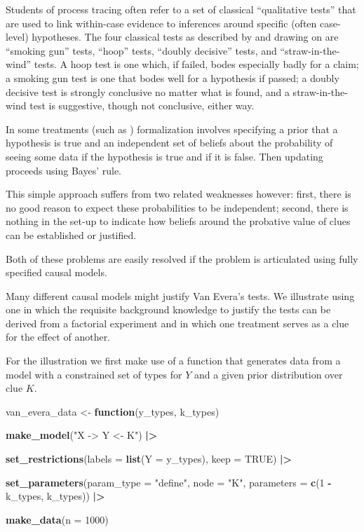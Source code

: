 \documentclass[
  12pt,
]{book}
\newenvironment{Shaded}{\begin{snugshade}}{\end{snugshade}}
\newcommand{\AttributeTok}[1]{\textcolor[rgb]{0.13,0.29,0.53}{#1}}
\newcommand{\ConstantTok}[1]{\textcolor[rgb]{0.56,0.35,0.01}{#1}}
\newcommand{\ControlFlowTok}[1]{\textcolor[rgb]{0.13,0.29,0.53}{\textbf{#1}}}
\newcommand{\DecValTok}[1]{\textcolor[rgb]{0.00,0.00,0.81}{#1}}
\newcommand{\FunctionTok}[1]{\textcolor[rgb]{0.13,0.29,0.53}{\textbf{#1}}}
\newcommand{\NormalTok}[1]{#1}
\newcommand{\OtherTok}[1]{\textcolor[rgb]{0.56,0.35,0.01}{#1}}
\newcommand{\SpecialCharTok}[1]{\textcolor[rgb]{0.81,0.36,0.00}{\textbf{#1}}}
\newcommand{\StringTok}[1]{\textcolor[rgb]{0.31,0.60,0.02}{#1}}
\begin{document}
Students of process tracing often refer to a set of classical ``qualitative tests'' that are used to link within-case evidence to inferences around specific (often case-level) hypotheses. The four classical tests as described by \citet{collier2011understanding} and drawing on \citet{Van-Evera:1997} are ``smoking gun'' tests, ``hoop'' tests, ``doubly decisive'' tests, and ``straw-in-the-wind'' tests. A hoop test is one which, if failed, bodes especially badly for a claim; a smoking gun test is one that bodes well for a hypothesis if passed; a doubly decisive test is strongly conclusive no matter what is found, and a straw-in-the-wind test is suggestive, though not conclusive, either way.

In some treatments (such as \citet{humphreys2015mixing}) formalization involves specifying a prior that a hypothesis is true and an independent set of beliefs about the probability of seeing some data if the hypothesis is true and if it is false. Then updating proceeds using Bayes' rule.

This simple approach suffers from two related weaknesses however: first, there is no good reason to expect these probabilities to be independent; second, there is nothing in the set-up to indicate how beliefs around the probative value of clues can be established or justified.

Both of these problems are easily resolved if the problem is articulated using fully specified causal models.

Many different causal models might justify Van Evera's tests. We illustrate using one in which the requisite background knowledge to justify the tests can be derived from a factorial experiment and in which one treatment serves as a clue for the effect of another.

For the illustration we first make use of a function that generates data from a model with a constrained set of types for \(Y\) and a given prior distribution over clue \(K\).

\begin{Shaded}
\begin{Highlighting}[]
\NormalTok{van\_evera\_data }\OtherTok{\textless{}{-}} \ControlFlowTok{function}\NormalTok{(y\_types, k\_types)}
  
  \FunctionTok{make\_model}\NormalTok{(}\StringTok{"X {-}\textgreater{} Y \textless{}{-} K"}\NormalTok{) }\SpecialCharTok{|\textgreater{}}
  
  \FunctionTok{set\_restrictions}\NormalTok{(}\AttributeTok{labels =} \FunctionTok{list}\NormalTok{(}\AttributeTok{Y =}\NormalTok{ y\_types), }\AttributeTok{keep =} \ConstantTok{TRUE}\NormalTok{) }\SpecialCharTok{|\textgreater{}}
  
  \FunctionTok{set\_parameters}\NormalTok{(}\AttributeTok{param\_type =} \StringTok{"define"}\NormalTok{, }\AttributeTok{node =} \StringTok{"K"}\NormalTok{, }\AttributeTok{parameters =} \FunctionTok{c}\NormalTok{(}\DecValTok{1} \SpecialCharTok{{-}}\NormalTok{ k\_types, k\_types)) }\SpecialCharTok{|\textgreater{}}
  
  \FunctionTok{make\_data}\NormalTok{(}\AttributeTok{n =} \DecValTok{1000}\NormalTok{)}
\end{Highlighting}
\end{Shaded}
\end{document}
